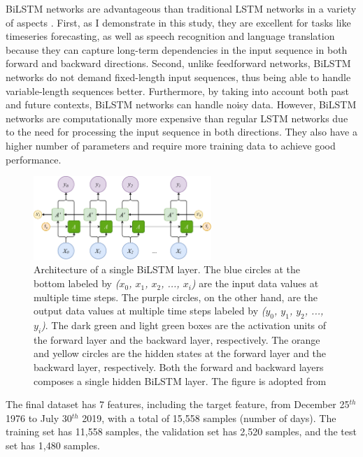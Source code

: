 BiLSTM networks are advantageous than traditional LSTM networks in a variety of aspects \citep{graves_2005, ihianle_2020, alharbi_2021}. First, as I demonstrate in this study, they are excellent for tasks like timeseries forecasting, as well as speech recognition and language translation \citep{wollmer_2013, graves_2014, sundermeyer_2014, huang_2018, nammous_2022} because they can capture long-term dependencies in the input sequence in both forward and backward directions. Second, unlike feedforward networks, BiLSTM networks do not demand fixed-length input sequences, thus being able to handle variable-length sequences better. Furthermore, by taking into account both past and future contexts, BiLSTM networks can handle noisy data.
However, BiLSTM networks are computationally more expensive than regular LSTM networks due to the need for processing the input sequence in both directions. They also have a higher number of parameters and require more training data to achieve good performance.

\begin{figure}[htp]
	\centering
    \includegraphics[width=0.6\textwidth]{chapter4/figs/diagram.drawio.pdf}
    \caption{Architecture of a single BiLSTM layer. The blue circles at the bottom labeled by \textit{($x_0$, $x_1$, $x_2$, ..., $x_i$)} are the input data values at multiple time steps. The purple circles, on the other hand, are the output data values at multiple time steps labeled by \textit{($y_0$, $y_1$, $y_2$, ..., $y_i$)}. The dark green and light green boxes are the activation units of the forward layer and the backward layer, respectively. The orange and yellow circles are the hidden states at the forward layer and the backward layer, respectively. Both the forward and backward layers composes a single hidden BiLSTM layer. The figure is adopted from \citet{olah_2015}}
\label{fig_model}
\end{figure}

The final dataset has 7 features, including the target feature, from December 25$^{th}$ 1976 to July 30$^{th}$ 2019, with a total of 15,558 samples (number of days). The training set has 11,558 samples, the validation set has 2,520 samples, and the test set has 1,480 samples.

